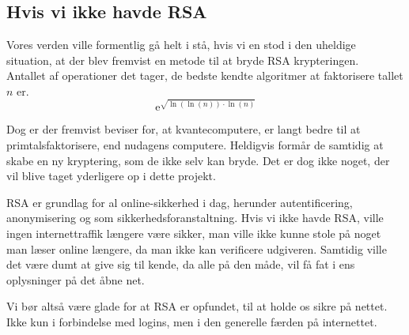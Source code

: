 \subsection{Hvis vi ikke havde RSA}
Vores verden ville formentlig gå helt i stå, hvis vi en stod i den uheldige situation, at der blev fremvist en metode til at bryde RSA krypteringen.\\
Antallet af operationer det tager, de bedste kendte algoritmer at faktorisere tallet \(n\) er.\cite[119]{krypto}
\[\mathrm{e}^{\sqrt{\ln(\ln(n)) \cdot \ln(n)}}\]

Dog er der fremvist beviser for, at kvantecomputere, er langt bedre til at primtalsfaktorisere, end nudagens computere.\cite{quantum}
Heldigvis formår de samtidig at skabe en ny kryptering, som de ikke selv kan bryde.
Det er dog ikke noget, der vil blive taget yderligere op i dette projekt.

RSA er grundlag for al online-sikkerhed i dag, herunder autentificering, anonymisering og som sikkerhedsforanstaltning.
Hvis vi ikke havde RSA, ville ingen internettraffik længere være sikker, man ville ikke kunne stole på noget man læser online længere, da man ikke kan verificere udgiveren.
Samtidig ville det være dumt at give sig til kende, da alle på den måde, vil få fat i ens oplysninger på det åbne net.

Vi bør altså være glade for at RSA er opfundet, til at holde os sikre på nettet. Ikke kun i forbindelse med logins, men i den generelle færden på internettet.
